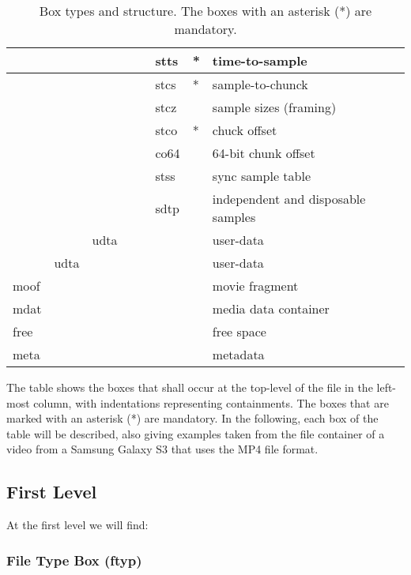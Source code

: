 \begin{table}[]
\begin{tabular}{|l|l|l|l|l|l|l|l|l}
       &      &      &      &      & stts & * & time-to-sample \\ \hline
       &      &      &      &      & stcs & * & sample-to-chunck \\ \hline
       &      &      &      &      & stcz &   & sample sizes (framing) \\ \hline
       &      &      &      &      & stco & * & chuck offset \\ \hline
       &      &      &      &      & co64 &   & 64-bit chunk offset \\ \hline
       &      &      &      &      & stss &   & sync sample table \\ \hline
       &      &      &      &      & sdtp &   & independent and disposable samples \\ \hline
       &      & udta &      &      &      &   & user-data \\ \hline
       & udta &      &      &      &      &   & user-data \\ \hline
  moof &      &      &      &      &      &   & movie fragment \\ \hline
  mdat &      &      &      &      &      &   & media data container \\ \hline
  free &      &      &      &      &      &   & free space \\ \hline
  meta &      &      &      &      &      &   & metadata \\ \hline
\end{tabular}
\caption{Box types and structure. The boxes with an asterisk (*) are mandatory.}\label{boxtable}
\end{table}

The table shows the boxes that shall occur at the top-level of the file in the left-most column, with indentations representing containments. The boxes that are marked with an asterisk (*) are mandatory. In the following, each box of the table will be described, also giving examples taken from the file container of a video from a Samsung Galaxy S3 that uses the MP4 file format.

\subsection{First Level}

At the first level we will find:

\subsubsection*{File Type Box (ftyp)}


